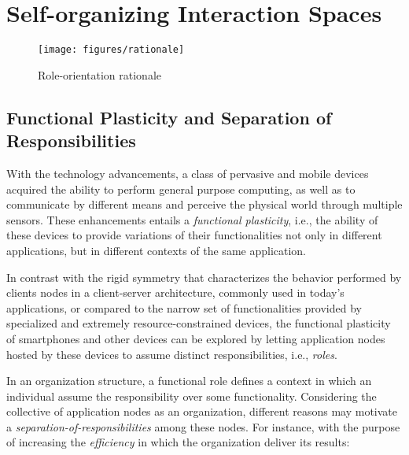 \section{Self-organizing Interaction Spaces}\label{sec:edge_spaces}

\begin{figure*}[t!]
	\centering
	\texttt{[image: figures/rationale]}
	\caption{Role-orientation rationale}
	\label{fig:rationale}
\end{figure*}

\subsection{Functional Plasticity and Separation of Responsibilities}


With the technology advancements, a class of pervasive and mobile devices acquired the ability to perform general purpose computing, as well as to communicate by different means and perceive the physical world through multiple sensors. These enhancements entails a \textit{functional plasticity}, i.e., the ability of these devices to provide variations of their functionalities not only in different applications, but in different contexts of the same application. 

In contrast with the rigid symmetry that characterizes the behavior performed by clients nodes in a client-server architecture, commonly used in today's applications, or compared to the narrow set of functionalities provided by specialized and extremely resource-constrained devices, the functional plasticity of smartphones and other devices can be explored by letting application nodes hosted by these devices to assume distinct responsibilities, i.e., \textit{roles}.

In an organization structure, a functional role defines a context in which an individual assume the responsibility over some functionality. 
Considering the collective of application nodes as an organization, different reasons may motivate a \textit{separation-of-responsibilities} among these nodes. 
For instance, with the purpose of increasing the \textit{efficiency} in which the organization deliver its results:
	
